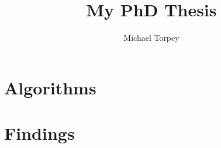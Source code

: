 \documentclass[a4paper]{report}
\title{My PhD Thesis}
\author{Michael Torpey}
\begin{document}
\maketitle

\tableofcontents

\doublespacing





\part{Algorithms}
\label{part:algorithms}




\part{Findings}
\label{part:findings}






\end{document}

